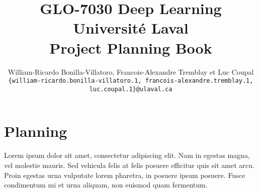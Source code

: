 \documentclass[10pt]{report} %
\title{
\textbf{GLO-7030 Deep Learning}\\
\vspace{1em}
Université Laval\\
\vspace{1em}
\huge Project Planning Book
\propositionVersion{1.0}
\vspace{2em}
}
\author{%
    \large
    William-Ricardo Bonilla-Villatoro,
    Francois-Alexandre Tremblay
    \textnormal{et} Luc Coupal \\
    {\footnotesize \texttt{\{william-ricardo.bonilla-villatoro.1, francois-alexandre.tremblay.1, luc.coupal.1\}@ulaval.ca}} \\
}
\begin{document}
    \maketitle
    \tableofcontents
    \newpage

    \section{Planning}
    Lorem ipsum dolor sit amet, consectetur adipiscing elit. Nam in egestas magna, vel molestie mauris. Sed vehicula felis at felis posuere efficitur quis sit amet arcu. Proin egestas urna vulputate lorem pharetra, in posuere ipsum posuere. Fusce condimentum mi et urna aliquam, non euismod quam fermentum.
\end{document}
